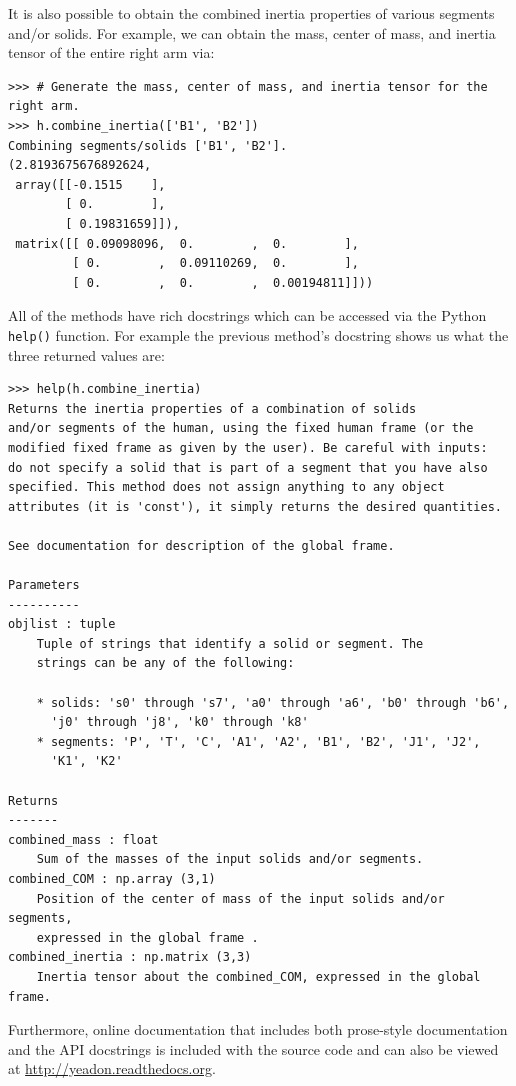 \documentclass[10pt]{article}
\begin{document}
It is also possible to obtain the combined inertia properties of various
segments and/or solids. For example, we can obtain the mass, center of mass,
and inertia tensor of the entire right arm via:

\begin{verbatim}
>>> # Generate the mass, center of mass, and inertia tensor for the right arm.
>>> h.combine_inertia(['B1', 'B2'])
Combining segments/solids ['B1', 'B2'].
(2.8193675676892624,
 array([[-0.1515    ],
        [ 0.        ],
        [ 0.19831659]]),
 matrix([[ 0.09098096,  0.        ,  0.        ],
         [ 0.        ,  0.09110269,  0.        ],
         [ 0.        ,  0.        ,  0.00194811]]))
\end{verbatim}

All of the methods have rich docstrings which can be accessed via the Python
\verb+help()+ function. For example the previous method's docstring shows us
what the three returned values are:

\begin{verbatim}
>>> help(h.combine_inertia)
Returns the inertia properties of a combination of solids
and/or segments of the human, using the fixed human frame (or the
modified fixed frame as given by the user). Be careful with inputs:
do not specify a solid that is part of a segment that you have also
specified. This method does not assign anything to any object
attributes (it is 'const'), it simply returns the desired quantities.

See documentation for description of the global frame.

Parameters
----------
objlist : tuple
    Tuple of strings that identify a solid or segment. The
    strings can be any of the following:

    * solids: 's0' through 's7', 'a0' through 'a6', 'b0' through 'b6',
      'j0' through 'j8', 'k0' through 'k8'
    * segments: 'P', 'T', 'C', 'A1', 'A2', 'B1', 'B2', 'J1', 'J2',
      'K1', 'K2'

Returns
-------
combined_mass : float
    Sum of the masses of the input solids and/or segments.
combined_COM : np.array (3,1)
    Position of the center of mass of the input solids and/or segments,
    expressed in the global frame .
combined_inertia : np.matrix (3,3)
    Inertia tensor about the combined_COM, expressed in the global frame.
\end{verbatim}
Furthermore, online documentation that includes both prose-style documentation
and the API docstrings is included with the source code and can also be viewed
at \url{http://yeadon.readthedocs.org}.
\end{document}
